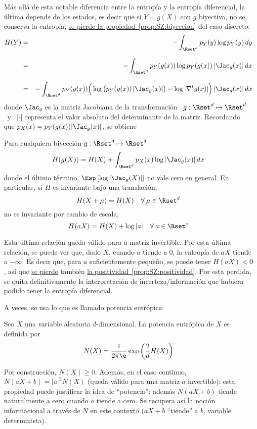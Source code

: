 M\'as  all\'a de esta  notable diferencia  entre la  entrop\'ia y  la entrop\'ia
diferencial, la \'ultima depende de los estados,  es decir que si $Y = g(X)$ con
$g$  biyectiva,  no se  conserva  la  entrop\'ia,  \ie \underline{se  pierde  la
  propiedad~\ref{prop:SZ:biyeccion}} del caso discreto:
%
\begin{eqnarray*}
H(Y) & = & - \int_{\Rset^d} p_Y(y) \log p_Y(y) \, dy\\[2.5mm]
%
& = &  - \int_{\Rset^d} p_Y(g(x)) \log p_Y(g(x)) \, |\Jac_g(x)| \, dx\\[2.5mm]
%
& = & - \int_{\Rset^d} p_Y(g(x)) \Big( \log \big( p_Y(g(x)) \, |\Jac_g(x)| \big) -
\log |\nabla^t g(x)| \Big) \, |\Jac_g(x)| \, dx
\end{eqnarray*}
%
donde $\Jac_g$ es la matriz Jacobiana
de  la  transformaci\'on  \   $g:  \Rset^d  \mapsto  \Rset^d$  \  
\ y  \ $|\cdot|$  representa el  valor absoluto del  determinante de  la matriz.
Recordando que $p_X(x) = p_Y(g(x)) |\Jac_g(x)|$, se obtiene
%
\begin{propiedadesC}\setcounter{enumi}{\value{PropBiyeccion}}
%
\item\label{prop:SZ:biyeccionC}
Para  cualquiera biyecci\'on $g:  \Rset^d \mapsto  \Rset^d$
  \[
  H(g(X)) = H(X) + \int_{\Rset^d} p_X(x) \log |\Jac_g(x)| \, dx
  \]
  donde el \'ultimo t\'ermino, $\Esp\left[  \log |\Jac_g(X)| \right]$ no vale cero
  en general.  En particular, si $H$ es invariante bajo una translaci\'on,
  \[
  H(X+\mu) = H(X) \quad \forall \: \mu \in \Rset^d
  \]
  no  es invariante  por cambio  de escala,
  \[
  H(a X) = H(X) + \log |a| \quad \forall \: a \in \Rset^*
  \]
\end{propiedadesC}
%
Esta \'ultima  relaci\'on queda v\'alido  para $a$ matriz invertible.   Por esta
\'ultima  relaci\'on, se puede  ver que,  dado $X$,  cuando $a$  tiende a  0, la
entrop\'ia de $a X$ tiende a  $-\infty$.  Es decir que, para $a$ suficientemente
peque\~no,  se  puede  tener $H(a  X)  <  0$,  as\'i que  \underline{se  pierde}
tambi\'en   \underline{la   positividad~\ref{prop:SZ:positividad}}.   Por   esta
perdida, se quita definitivamente la interpretaci\'on de incerteza/informaci\'on
que hubiera podido tener la entrop\'ia diferencial.

A veces, se usa lo que es llamado potencia entr\'opica:
%
\begin{definicion}
  Sea $X$ una variable aleatoria $d$-dimensional. La potencia entr\'opica de $X$
  es definida por
  \[
  N(X) = \frac{1}{2 \pi \e} \exp\left( \frac2d H(X) \right)
  \]
\end{definicion}
%
\noindent Por construcci\'on, $N(X) \ge 0$.  Adem\'as, en el caso continuo, $N(a
X+b)  =  |a|^2 N(X)$  (queda  v\'alido para  una  matriz  $a$ invertible):  esta
propiedad puede justificar  la idea de ``potencia''; adem\'as  $N(a X+b)$ tiende
naturalmente a  cero cuando $a$  tiende a cero.   Se recupera as\'i  la noci\'on
informacional a trav\'es  de $N$ en este  contexto ($a X + b$  ``tiende'' a $b$,
variable determinista).

